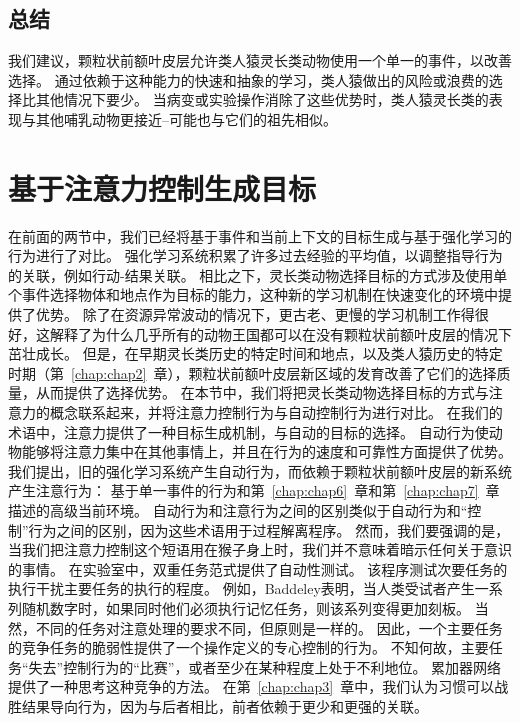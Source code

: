 \subsection{总结}

我们建议，颗粒状前额叶皮层允许类人猿灵长类动物使用一个单一的事件，以改善选择。
通过依赖于这种能力的快速和抽象的学习，类人猿做出的风险或浪费的选择比其他情况下要少。
当病变或实验操作消除了这些优势时，类人猿灵长类的表现与其他哺乳动物更接近--可能也与它们的祖先相似。



\section{基于注意力控制生成目标}

在前面的两节中，我们已经将基于事件和当前上下文的目标生成与基于强化学习的行为进行了对比。
强化学习系统积累了许多过去经验的平均值，以调整指导行为的关联，例如行动-结果关联。
相比之下，灵长类动物选择目标的方式涉及使用单个事件选择物体和地点作为目标的能力，这种新的学习机制在快速变化的环境中提供了优势。
除了在资源异常波动的情况下，更古老、更慢的学习机制工作得很好，这解释了为什么几乎所有的动物王国都可以在没有颗粒状前额叶皮层的情况下茁壮成长。
但是，在早期灵长类历史的特定时间和地点，以及类人猿历史的特定时期（第~\ref{chap:chap2}~章），颗粒状前额叶皮层新区域的发育改善了它们的选择质量，从而提供了选择优势。
在本节中，我们将把灵长类动物选择目标的方式与注意力的概念联系起来，并将注意力控制行为与自动控制行为进行对比。
在我们的术语中，注意力提供了一种目标生成机制，与自动的目标的选择。
自动行为使动物能够将注意力集中在其他事情上，并且在行为的速度和可靠性方面提供了优势。
我们提出，旧的强化学习系统产生自动行为，而依赖于颗粒状前额叶皮层的新系统产生注意行为：
基于单一事件的行为和第~\ref{chap:chap6}~章和第~\ref{chap:chap7}~章描述的高级当前环境。
自动行为和注意行为之间的区别类似于自动行为和“控制”行为之间的区别，因为这些术语用于过程解离程序。
然而，我们要强调的是，当我们把注意力控制这个短语用在猴子身上时，我们并不意味着暗示任何关于意识的事情。
在实验室中，双重任务范式提供了自动性测试。
该程序测试次要任务的执行干扰主要任务的执行的程度。
例如，Baddeley\cite{shallice1996domain}表明，当人类受试者产生一系列随机数字时，如果同时他们必须执行记忆任务，则该系列变得更加刻板。
当然，不同的任务对注意处理的要求不同，但原则是一样的。
因此，一个主要任务的竞争任务的脆弱性提供了一个操作定义的专心控制的行为。
不知何故，主要任务“失去”控制行为的“比赛”，或者至少在某种程度上处于不利地位。
累加器网络提供了一种思考这种竞争的方法。
在第~\ref{chap:chap3}~章中，我们认为习惯可以战胜结果导向行为，因为与后者相比，前者依赖于更少和更强的关联。
